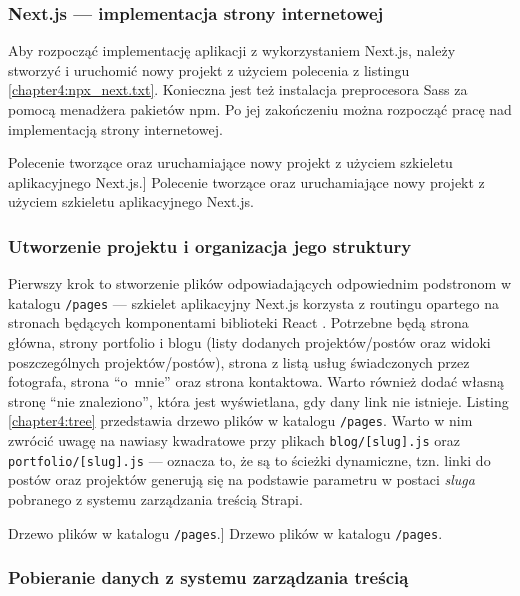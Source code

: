 \documentclass[a4paper, 12pt]{article}
\numberwithin{figure}{section}
\begin{document}
\begin{sloppypar}
\subsubsection{Next.js --- implementacja strony internetowej}
Aby rozpocząć implementację aplikacji z wykorzystaniem Next.js, należy stworzyć i uruchomić nowy projekt z użyciem polecenia z listingu \ref{chapter4:npx_next.txt}. Konieczna jest też instalacja preprocesora Sass za pomocą menadżera pakietów npm. Po jej zakończeniu można rozpocząć pracę nad implementacją strony internetowej.

\begin{code}[htbp]
    
    \caption
    [Polecenie tworzące oraz uruchamiające nowy projekt z użyciem szkieletu aplikacyjnego Next.js.]
    {Polecenie tworzące oraz uruchamiające nowy projekt z użyciem szkieletu aplikacyjnego Next.js.}
    \label{chapter4:npx_next.txt}
\end{code}

\subsubsection*{Utworzenie projektu i organizacja jego struktury}
 Pierwszy krok to stworzenie plików odpowiadających odpowiednim podstronom w katalogu \texttt{/pages} --- szkielet aplikacyjny Next.js korzysta z routingu opartego na stronach będących komponentami biblioteki React \cite{nextdocs}. Potrzebne będą strona główna, strony portfolio i blogu (listy dodanych projektów/postów oraz widoki poszczególnych projektów/postów), strona z listą usług świadczonych przez fotografa, strona ``o~mnie'' oraz strona kontaktowa. Warto również dodać własną stronę ``nie znaleziono'', która jest wyświetlana, gdy dany link nie istnieje. Listing \ref{chapter4:tree} przedstawia drzewo plików w katalogu \texttt{/pages}. Warto w nim zwrócić uwagę na nawiasy kwadratowe przy plikach \texttt{blog/[slug].js} oraz \texttt{portfolio/[slug].js} --- oznacza to, że są to ścieżki dynamiczne, tzn. linki do postów oraz projektów generują się na podstawie parametru w postaci \textit{sluga} pobranego z systemu zarządzania treścią Strapi. 

\begin{code}[htbp]
    
    \caption
    [Drzewo plików w katalogu \texttt{/pages}.]
    {Drzewo plików w katalogu \texttt{/pages}.}
    \label{chapter4:tree}
\end{code}

\subsubsection*{Pobieranie danych z systemu zarządzania treścią}


\end{sloppypar}
\end{document}
